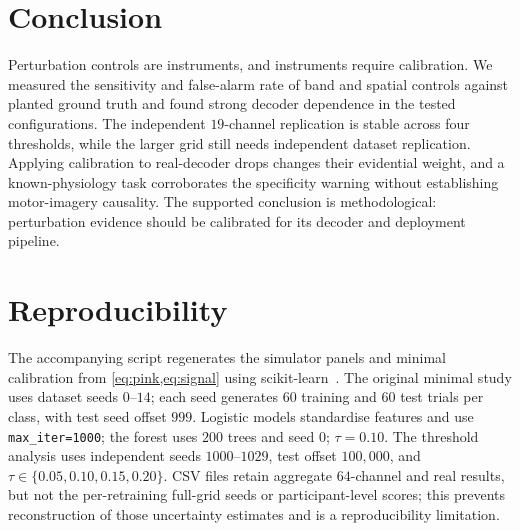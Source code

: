 \documentclass[manuscript,nonacm]{acmart}
\begin{document}
\section{Conclusion}
Perturbation controls are instruments, and instruments require calibration. We measured
the sensitivity and false-alarm rate of band and spatial controls against planted ground
truth and found strong decoder dependence in the tested configurations. The independent
$19$-channel replication is stable across four thresholds, while the larger grid still
needs independent dataset replication. Applying calibration to real-decoder drops changes
their evidential weight, and a known-physiology task corroborates the specificity warning
without establishing motor-imagery causality. The supported conclusion is methodological:
perturbation evidence should be calibrated for its decoder and deployment pipeline.

\section*{Reproducibility}
The accompanying script regenerates the simulator panels and minimal calibration from
\cref{eq:pink,eq:signal} using scikit-learn~\cite{pedregosa2011}. The original minimal
study uses dataset seeds $0$--$14$; each seed generates $60$ training and $60$ test
trials per class, with test seed offset $999$. Logistic models standardise features and
use \texttt{max\_iter=1000}; the forest uses $200$ trees and seed $0$; $\tau=0.10$.
The threshold analysis uses independent seeds $1000$--$1029$, test offset $100{,}000$,
and $\tau\in\{0.05,0.10,0.15,0.20\}$. CSV files retain aggregate $64$-channel and real
results, but not the per-retraining full-grid seeds or participant-level scores; this
prevents reconstruction of those uncertainty estimates and is a reproducibility limitation.



\end{document}
